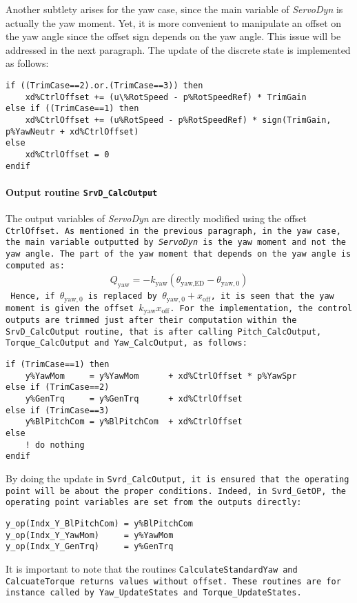\documentclass[11pt]{article}
\begin{document}
Another subtlety arises for the yaw case, since the main variable of \textit{ServoDyn} is actually the yaw moment. Yet, it is more convenient to manipulate an offset on the yaw angle since the offset sign depends on the yaw angle. 
This issue will be addressed in the next paragraph.
The update of the discrete state is implemented as follows:
\begin{lstlisting}
if ((TrimCase==2).or.(TrimCase==3)) then
    xd%CtrlOffset += (u\%RotSpeed - p%RotSpeedRef) * TrimGain 
else if ((TrimCase==1) then
    xd%CtrlOffset += (u%RotSpeed - p%RotSpeedRef) * sign(TrimGain, p%YawNeutr + xd%CtrlOffset)
else
    xd%CtrlOffset = 0
endif
\end{lstlisting}




\paragraph{Output routine \tt{SrvD\_CalcOutput}}
The output variables of \textit{ServoDyn} are directly modified using the offset \tt{CtrlOffset}.
As mentioned in the previous paragraph, in the yaw case, the main variable outputted by \textit{ServoDyn} is the yaw moment and not the yaw angle. The part of the yaw moment that depends on the yaw angle is computed as:
\begin{align}
    Q_\text{yaw}= - k_\text{yaw} ( \theta_\text{yaw,ED} - \theta_{\text{yaw},0})
\end{align}
Hence, if $\theta_{\text{yaw},0}$ is replaced by  $\theta_{\text{yaw},0}+x_\text{off}$, it is seen that the yaw moment is given the offset $k_\text{yaw} x_\text{off}$.
% 
% 
For the implementation, the control outputs are trimmed just after their computation within the  \tt{SrvD\_CalcOutput} routine, that is after calling \tt{Pitch\_CalcOutput}, \tt{Torque\_CalcOutput} and \tt{Yaw\_CalcOutput}, as follows:
\begin{lstlisting}
if (TrimCase==1) then
    y%YawMom     = y%YawMom      + xd%CtrlOffset * p%YawSpr
else if (TrimCase==2)
    y%GenTrq     = y%GenTrq      + xd%CtrlOffset
else if (TrimCase==3)
    y%BlPitchCom = y%BlPitchCom  + xd%CtrlOffset
else
    ! do nothing
endif
\end{lstlisting}
By doing the update in \tt{Svrd\_CalcOutput}, it is ensured that the operating point will be about the proper conditions. Indeed, in \tt{Svrd\_GetOP}, the operating point variables are set from the outputs directly:
\begin{lstlisting}
y_op(Indx_Y_BlPitchCom) = y%BlPitchCom
y_op(Indx_Y_YawMom)     = y%YawMom 
y_op(Indx_Y_GenTrq)     = y%GenTrq
\end{lstlisting}
It is important to note that the routines \tt{CalculateStandardYaw} and \tt{CalcuateTorque} returns values without offset. These routines are for instance called by  \tt{Yaw\_UpdateStates}  and \tt{Torque\_UpdateStates}.
\end{document}
